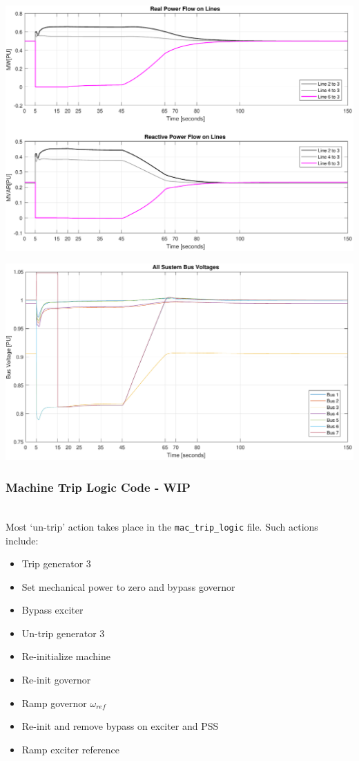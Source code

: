 \includegraphics[width=\linewidth]{examples/untrip/combinedLoadFlow}

\includegraphics[width=\linewidth]{examples/untrip/combinedBusV}

\pagebreak
\subsubsection{Machine Trip Logic Code - WIP} \ \\
Most `un-trip' action takes place in the \verb|mac_trip_logic| file.
Such actions include:
\begin{itemize}
\item Trip generator 3
\item Set mechanical power to zero and bypass governor
\item Bypass exciter
\item Un-trip generator 3
\item Re-initialize machine
\item Re-init governor
\item Ramp governor $\omega_{ref}$
\item Re-init and remove bypass on exciter and PSS
\item Ramp exciter reference
\end{itemize} 

